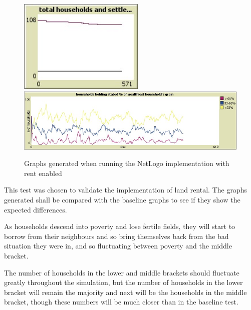 \documentclass[12pt]{article}
\begin{document}
					\begin{figure}[!htb]
						\includegraphics[width=6cm]{Land_rental_enabled_run1_C}\\
						\includegraphics[width=15cm]{Land_rental_enabled_run1_D}
						\caption{Graphs generated when running the NetLogo implementation with rent enabled}
						\label{fig:Land_rental_enabled_Netlogo_1}
					\end{figure}
				This test was chosen to validate the implementation of land rental. The graphs generated shall be compared with the baseline graphs to see if they show the expected differences.
		
				As households descend into poverty and lose fertile fields, they will start to borrow from their neighbours and so bring themselves back from the bad situation they were in, and so fluctuating between poverty and the middle bracket.
		
				The number of households in the lower and middle brackets should fluctuate greatly throughout the simulation, but the number of households in the lower bracket will remain the majority and next will be the households in the middle bracket, though these numbers will be much closer than in the baseline test. 
		
		
\end{document}
